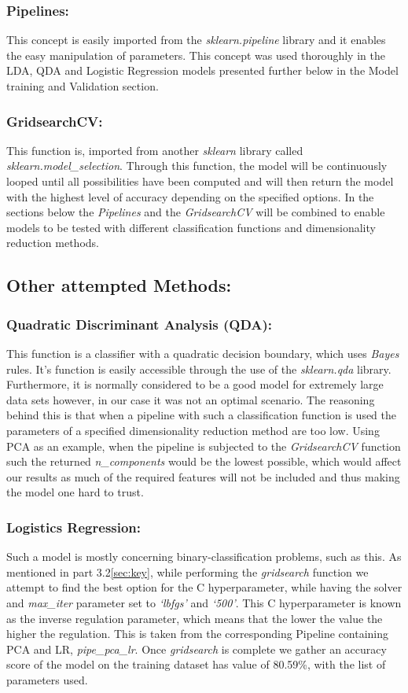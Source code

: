 \documentclass{article}
\begin{document}
\subsubsection{Pipelines:}
This concept is easily imported from the \textit{sklearn.pipeline} library and it enables the easy manipulation of parameters. This concept was used thoroughly in the LDA, QDA and Logistic Regression models presented further below in the Model training and Validation section.
\subsubsection{GridsearchCV:}
This function is, imported from another \textit{sklearn} library called \textit{sklearn.model\_selection}. Through this function, the model will be continuously looped until all possibilities have been computed and will then return the model with the highest level of accuracy depending on the specified options. In the sections below the \textit{Pipelines} and the \textit{GridsearchCV} will be combined to enable models to be tested with different classification functions and dimensionality reduction methods.

\subsection{Other attempted Methods:}
\subsubsection{Quadratic Discriminant Analysis (QDA)\cite{qda}:}
This function is a classifier with a quadratic decision boundary, which uses \textit{Bayes} rules. It’s function is easily accessible through the use of the \textit{sklearn.qda} library. Furthermore, it is normally considered to be a good model for extremely large data sets however, in our case it was not an optimal scenario. The reasoning behind this is that when a pipeline with such a classification function is used the parameters of a specified dimensionality reduction method are too low. Using PCA as an example, when the pipeline is subjected to the \textit{GridsearchCV} function such the returned \textit{n\_components} would be the lowest possible, which would affect our results as much of the required features will not be included and thus making the model one hard to trust. 
\subsubsection{Logistics Regression:}
Such a model is mostly concerning binary-classification problems, such as this. As mentioned in part 3.2\ref{sec:key}, while performing the \textit{gridsearch} function we attempt to find the best option for the C hyperparameter, while having the solver and \textit{max\_iter} parameter set to \textit{‘lbfgs’} and \textit{‘500’}. This C hyperparameter is known as the inverse regulation parameter, which means that the lower the value the higher the regulation. This is taken from the corresponding Pipeline containing PCA and LR\cite{lr}, \textit{pipe\_pca\_lr}. Once \textit{gridsearch} is complete we gather an accuracy score of the model on the training dataset has value of 80.59\%, with the list of parameters used.
\end{document}
